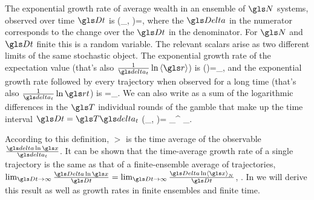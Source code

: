 The exponential growth rate of average wealth in an ensemble of $\N$ systems, observed over time $\Dt$ is
\be
\gm(\ave{\x(\t)}_\N, \Dt)=\frac{\D \ln \ave{\x}_\N}{\Dt},
\ee
where the $\D$ in the numerator corresponds to the change over the $\Dt$ in the denominator. For $\N$ and $\Dt$ finite this is a random variable. The relevant scalars arise as two different limits
of the same stochastic object. The exponential growth rate of the expectation value 
(that's also $\frac{1}{\dt} \ln \ave{\gr}$) is
\be
\gm(\ave{\x})=\lim_{\N\to\infty}\gm,
\ee
and the exponential growth rate followed by every trajectory when
observed for a long time (that's also $\frac{1}{\dt} \ln \rt$) is 
\be
\gt=\lim_{\Dt\to\infty}\gm.
\ee
We can also write  as a sum of the logarithmic differences in  the 
$\T$ individual rounds of the gamble that make up the time interval 
$\Dt=\T \dt$
\be
\gm(\ave{\x(\t)}_\N, \Dt)=  \sum_{}^{\T} \D\ln \ave{\x(\t+\gtau\dt)}_\N.
\ee

According to this definition, $\gt$ is the time average of 
the observable $\frac{\d \ln \x}{\dt}$. It can be shown that
the time-average growth rate of a single trajectory is the same as that
of a finite-ensemble average of trajectories,
$\lim_{\Dt\to\infty}\frac{\D \ln \x}{\Dt}=\lim_{\Dt\to\infty}\frac{\D \ln \ave{\x}_N}{\Dt}$, \cite{PetersKlein2013}. In  we will derive this result as well as growth rates in finite ensembles and finite time.

